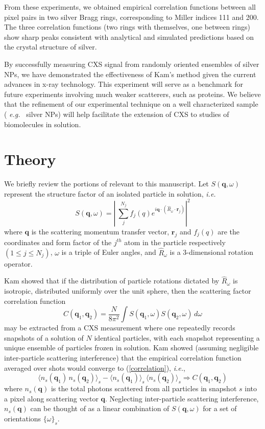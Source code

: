 \documentclass [11pt,fleqn]{article}
\def \be {\begin{equation}}
\def \ee {\end{equation}}
\begin{document}
From these experiments, we obtained empirical correlation functions between all pixel pairs in two silver Bragg rings, corresponding to Miller indices 111 and 200. The three correlation functions (two rings with themselves, one between rings) show sharp peaks consistent with analytical and simulated predictions based on the crystal structure of silver.

By successfully measuring CXS signal from randomly oriented ensembles of silver NPs, we have demonstrated the effectiveness of Kam's method given the current advances in x-ray technology. This experiment will serve as a benchmark for future experiments involving much weaker scatterers, such as proteins. We believe that the refinement of our experimental technique on a well characterized sample ( \textit{e.g.}~ silver NPs) will help facilitate the extension of CXS to studies of biomolecules in solution.

\section{Theory}

We briefly review the portions of \cite{Kam:1977wc} relevant to this manuscript. Let $S( \bm q,\omega)$ represent the structure factor of an isolated particle in solution, \textit{i.e.}
\be \label{structurefactor}
S(\bm q,\omega) = \left| \> \sum_{j}^{N_j} f_j (q )e^{i \bm q \cdot  \left( \hat{R}_\omega \cdot \bm r_j\right)  } \right| ^{2}
\ee
where $\bm q$ is the scattering momentum transfer vector,  $\bm r_j$ and $f_j (q )$ are the coordinates and form factor of the $j^{th}$ atom in the particle respectively $( 1 \leq j \leq N_{j} )$, $\omega$ is a triple of Euler angles, and $\hat{R}_\omega$ is a 3-dimensional rotation operator.

Kam showed that if the distribution of particle rotations dictated by $\hat{R}_\omega$ is isotropic, distributed uniformly over the unit sphere, then the scattering factor correlation function
\be \label{correlation}
C(\bm q_1, \bm q_2) = \frac{N}{8 \pi^{2}}\int S( \bm q_{1},\omega ) S( \bm q_{2},\omega ) \, d \omega
\ee
may be extracted from a CXS measurement where one repeatedly records snapshots of a solution of $N$ identical particles, with each snapshot representing a unique ensemble of particles frozen in solution. Kam showed (assuming negligible inter-particle scattering interference) that the empirical correlation function averaged over shots would converge to (\ref{correlation}), \textit{i.e.},
\be \label{converge}
\big \langle   n_s(\bm q_1)  \, n_s(\bm q_2) \big \rangle_s  - \big \langle {n}_s(\bm q_1) \big \rangle_s \, \big \langle {n}_s(\bm q_2) \big \rangle_s   \Rightarrow C(\bm q_1, \bm q_2) 
\ee
where $n_{s}(\bm q)$ is the total photons scattered from all particles in snapshot $s$ into a pixel along scattering vector $\bm q$. Neglecting inter-particle scattering interference, $n_{s}(\bm q)$ can be thought of as a linear combination of $S(\bm q,\omega)$ for a set of orientations $\{ \omega\}_{s}$.
\end{document}
